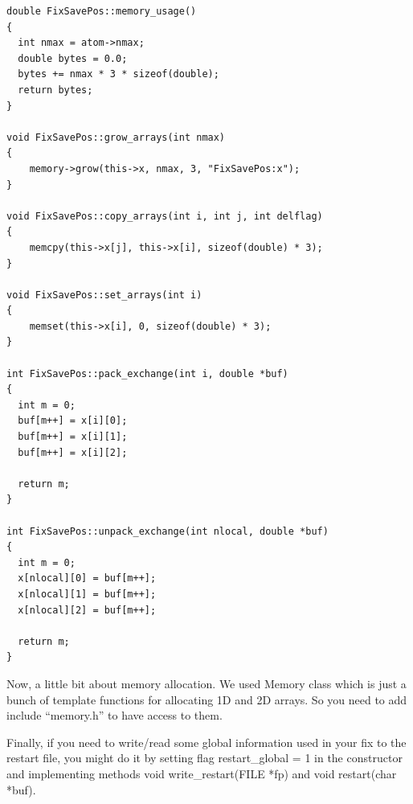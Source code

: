 \documentclass{article}
\begin{document}
\begin{center}
\begin{verbatim}
double FixSavePos::memory_usage()
{
  int nmax = atom->nmax;
  double bytes = 0.0;
  bytes += nmax * 3 * sizeof(double);
  return bytes;
}

void FixSavePos::grow_arrays(int nmax)
{
    memory->grow(this->x, nmax, 3, "FixSavePos:x");
}

void FixSavePos::copy_arrays(int i, int j, int delflag)
{
    memcpy(this->x[j], this->x[i], sizeof(double) * 3);
}

void FixSavePos::set_arrays(int i)
{
    memset(this->x[i], 0, sizeof(double) * 3);
}

int FixSavePos::pack_exchange(int i, double *buf)
{
  int m = 0;
  buf[m++] = x[i][0];
  buf[m++] = x[i][1];
  buf[m++] = x[i][2];

  return m;
}

int FixSavePos::unpack_exchange(int nlocal, double *buf)
{
  int m = 0;
  x[nlocal][0] = buf[m++];
  x[nlocal][1] = buf[m++];
  x[nlocal][2] = buf[m++];

  return m;
}
\end{verbatim}
\end{center}

Now, a little bit about memory allocation. We used Memory class which
is just a bunch of template functions for allocating 1D and 2D
arrays. So you need to add include ``memory.h'' to have access to them.

Finally, if you need to write/read some global information used in
your fix to the restart file, you might do it by setting flag
restart\_global = 1 in the constructor and implementing methods void
write\_restart(FILE *fp) and void restart(char *buf).
\end{document}
